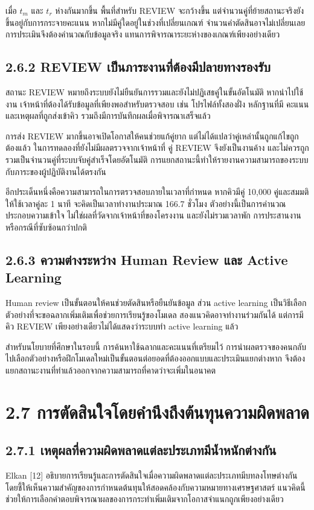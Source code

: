 \documentclass[12pt,a4paper]{report}
\begin{document}
เมื่อ $t_m$ และ $t_r$ ห่างกันมากขึ้น พื้นที่สำหรับ REVIEW จะกว้างขึ้น แต่จำนวนคู่ที่ย้ายสถานะจริงยังขึ้นอยู่กับการกระจายคะแนน หากไม่มีคู่ใดอยู่ในช่วงที่เปลี่ยนเกณฑ์ จำนวนคำตัดสินอาจไม่เปลี่ยนเลย การประเมินจึงต้องคำนวณกับข้อมูลจริง แทนการพิจารณาระยะห่างของเกณฑ์เพียงอย่างเดียว

\subsection*{2.6.2 REVIEW เป็นภาระงานที่ต้องมีปลายทางรองรับ}
สถานะ REVIEW หมายถึงระบบยังไม่ยืนยันการรวมและยังไม่ปฏิเสธคู่ในขั้นอัตโนมัติ หากนำไปใช้งาน เจ้าหน้าที่ต้องได้รับข้อมูลที่เพียงพอสำหรับตรวจสอบ เช่น โปรไฟล์ทั้งสองฝั่ง หลักฐานที่มี คะแนน และเหตุผลที่ถูกส่งเข้าคิว รวมถึงมีการบันทึกผลเมื่อพิจารณาเสร็จแล้ว

การส่ง REVIEW มากขึ้นอาจเปิดโอกาสให้คนช่วยแก้คู่ยาก แต่ไม่ได้แปลว่าคู่เหล่านั้นถูกแก้ไขถูกต้องแล้ว ในการทดลองที่ยังไม่มีผลตรวจจากเจ้าหน้าที่ คู่ REVIEW จึงยังเป็นงานค้าง และไม่ควรถูกรวมเป็นจำนวนคู่ที่ระบบจับคู่สำเร็จโดยอัตโนมัติ การแยกสถานะนี้ทำให้รายงานความสามารถของระบบกับภาระของผู้ปฏิบัติงานได้ตรงกัน

อีกประเด็นหนึ่งคือความสามารถในการตรวจสอบภายในเวลาที่กำหนด หากคิวมีคู่ 10,000 คู่และสมมติให้ใช้เวลาคู่ละ 1 นาที จะคิดเป็นเวลาทำงานประมาณ 166.7 ชั่วโมง ตัวอย่างนี้เป็นการคำนวณประกอบความเข้าใจ ไม่ใช่ผลที่วัดจากเจ้าหน้าที่ของโครงงาน และยังไม่รวมเวลาพัก การประสานงาน หรือกรณีที่ซับซ้อนกว่าปกติ

\subsection*{2.6.3 ความต่างระหว่าง Human Review และ Active Learning}
Human review เป็นขั้นตอนให้คนช่วยตัดสินหรือยืนยันข้อมูล ส่วน active learning เป็นวิธีเลือกตัวอย่างที่จะขอฉลากเพิ่มเติมเพื่อช่วยการเรียนรู้ของโมเดล สองแนวคิดอาจทำงานร่วมกันได้ แต่การมีคิว REVIEW เพียงอย่างเดียวไม่ได้แสดงว่าระบบทำ active learning แล้ว

สำหรับนโยบายที่ศึกษาในรอบนี้ การค้นหาใช้ฉลากและคะแนนที่เตรียมไว้ การนำผลตรวจของคนกลับไปเลือกตัวอย่างหรือฝึกโมเดลใหม่เป็นขั้นตอนต่อยอดที่ต้องออกแบบและประเมินแยกต่างหาก จึงต้องแยกสถานะงานที่ทำแล้วออกจากความสามารถที่คาดว่าจะเพิ่มในอนาคต

\section*{2.7 การตัดสินใจโดยคำนึงถึงต้นทุนความผิดพลาด}
\subsection*{2.7.1 เหตุผลที่ความผิดพลาดแต่ละประเภทมีน้ำหนักต่างกัน}
Elkan [12] อธิบายการเรียนรู้และการตัดสินใจเมื่อความผิดพลาดแต่ละประเภทมีบทลงโทษต่างกัน โดยชี้ให้เห็นความสำคัญของการกำหนดต้นทุนให้สอดคล้องกับความหมายทางเศรษฐศาสตร์ แนวคิดนี้ช่วยให้การเลือกคำตอบพิจารณาผลของการกระทำเพิ่มเติมจากโอกาสจำแนกถูกเพียงอย่างเดียว
\end{document}
